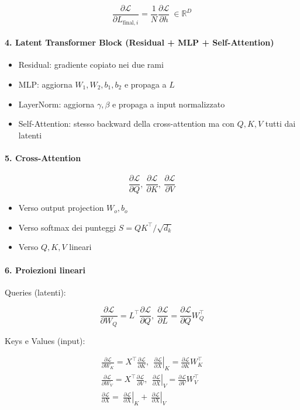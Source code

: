 \documentclass[
  11pt,
]{article}
\begin{document}
\[\frac{\partial\mathcal{L}}{\partial L_{\text{final},i}} = \frac{1}{N}\frac{\partial\mathcal{L}}{\partial h}\  \in \mathbb{R}^{D}\]

\paragraph{4. Latent Transformer Block (Residual + MLP + Self-Attention)}

\begin{itemize}
\item
  Residual: gradiente copiato nei due rami
\item
  MLP: aggiorna \(W_{1},W_{2},b_{1},b_{2}\) e propaga a \(L\)
\item
  LayerNorm: aggiorna \(\gamma,\beta\) e propaga a input normalizzato
\item
  Self-Attention: stesso backward della cross-attention ma con \(Q,K,V\)
  tutti dai latenti
\end{itemize}

\paragraph{5. Cross-Attention}

\[\frac{\partial\mathcal{L}}{\partial Q},\ \frac{\partial\mathcal{L}}{\partial K},\ \frac{\partial\mathcal{L}}{\partial V}\]

\begin{itemize}
\item
  Verso output projection \(W_{o},b_{o}\)
\item
  Verso softmax dei punteggi \(S = QK^{\top}/\sqrt{d_{k}}\)
\item
  Verso \(Q,K,V\) lineari
\end{itemize}

\paragraph{6. Proiezioni lineari}

Queries (latenti):

\[\frac{\partial\mathcal{L}}{\partial W_{Q}} = L^{\top}\frac{\partial\mathcal{L}}{\partial Q},\ \frac{\partial\mathcal{L}}{\partial L} = \frac{\partial\mathcal{L}}{\partial Q}W_{Q}^{\top}\]

Keys e Values (input):

\[\begin{matrix}
\frac{\partial\mathcal{L}}{\partial W_{K}} = X^{\top}\frac{\partial\mathcal{L}}{\partial K},\left. \ \ \frac{\partial\mathcal{L}}{\partial X} \right|_{K} = \frac{\partial\mathcal{L}}{\partial K}W_{K}^{\top} \\
\frac{\partial\mathcal{L}}{\partial W_{V}} = X^{\top}\frac{\partial\mathcal{L}}{\partial V},\left. \ \ \frac{\partial\mathcal{L}}{\partial X} \right|_{V} = \frac{\partial\mathcal{L}}{\partial V}W_{V}^{\top} \\
\frac{\partial\mathcal{L}}{\partial X} = \left. \ \frac{\partial\mathcal{L}}{\partial X} \right|_{K} + \left. \ \frac{\partial\mathcal{L}}{\partial X} \right|_{V}
\end{matrix}\]
\end{document}
